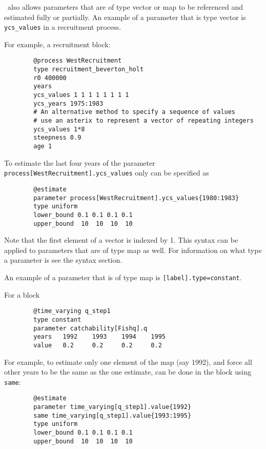 \CNAME\ also allows parameters that are of type vector or map to be referenced and estimated fully or partially. An example of a parameter that is type vector is \texttt{ycs\_values} in a recruitment process.

For example, a recruitment block:

{\small{\begin{verbatim}
		@process WestRecruitment
		type recruitment_beverton_holt
		r0 400000
		years
		ycs_values 1 1 1 1 1 1 1 1
		ycs_years 1975:1983
		# An alternative method to specify a sequence of values
		# use an asterix to represent a vector of repeating integers
		ycs_values 1*8
		steepness 0.9
		age 1
		\end{verbatim}}}

To estimate the last four years of the parameter \texttt{process[WestRecruitment].ycs\_values} only can be specified as

{\small{\begin{verbatim}
		@estimate
		parameter process[WestRecruitment].ycs_values{1980:1983}
		type uniform
		lower_bound 0.1 0.1 0.1 0.1
		upper_bound  10  10  10  10
		\end{verbatim}}}

Note that the first element of a vector is indexed by 1. This syntax can be applied to parameters that are of type map as well. For information on what type a parameter is see the syntax section.

An example of a parameter that is of type map is \texttt{[label].type=constant}.

For a  block

{\small{\begin{verbatim}
		@time_varying q_step1
		type constant
		parameter catchability[Fishq].q
		years 	1992	1993	1994	1995
		value 	0.2		0.2		0.2		0.2
		\end{verbatim}}}

For example, to estimate only one element of the map (say 1992), and force all other years to be the same as the one estimate, can be done in the  block using \texttt{same}:

{\small{\begin{verbatim}
		@estimate
		parameter time_varying[q_step1].value{1992}
		same time_varying[q_step1].value{1993:1995}
		type uniform
		lower_bound 0.1 0.1 0.1 0.1
		upper_bound  10  10  10  10
		\end{verbatim}}}
	
\paragraph*{\label{sec:declare}}

